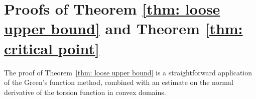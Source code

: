 \documentclass{amsart}
\theoremstyle{plain}
\begin{document}



\section{Proofs of Theorem \ref{thm: loose upper bound} and Theorem \ref{thm: critical point}}\label{sec:proofs}
The proof of Theorem~\ref{thm: loose upper bound} is a straightforward application of the Green's function method, combined with an estimate on the normal derivative of the torsion function
in convex domains.
\end{document}
